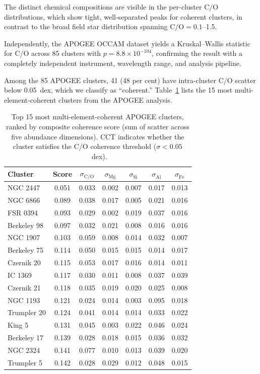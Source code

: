 \documentclass[fleqn,usenatbib]{mnras}
\newcommand{\co}{C/O\xspace}
\begin{document}
The distinct chemical compositions are visible in the per-cluster \co distributions, which show tight, well-separated peaks for coherent clusters, in contrast to the broad field star distribution spanning $\mathrm{C/O} = 0.1$--1.5.

Independently, the APOGEE OCCAM dataset yields a Kruskal--Wallis statistic for \co across 85 clusters with $p = 8.8 \times 10^{-104}$, confirming the result with a completely independent instrument, wavelength range, and analysis pipeline.

Among the 85 APOGEE clusters, 41 (48 per cent) have intra-cluster \co scatter below 0.05~dex, which we classify as ``coherent.''
Table~\ref{tab:coherent_clusters} lists the 15 most multi-element-coherent clusters from the APOGEE analysis.

\begin{table}
\centering
\caption{Top 15 most multi-element-coherent APOGEE clusters, ranked by composite coherence score (sum of scatter across five abundance dimensions). CCT indicates whether the cluster satisfies the C/O coherence threshold ($\sigma < 0.05$~dex).}
\label{tab:coherent_clusters}
\begin{tabular}{lcccccc}
\toprule
Cluster & Score & $\sigma_{\mathrm{C/O}}$ & $\sigma_{\mathrm{Mg}}$ & $\sigma_{\mathrm{Si}}$ & $\sigma_{\mathrm{Al}}$ & $\sigma_{\mathrm{Fe}}$ \\
\midrule
NGC 2447    & 0.051 & 0.033 & 0.002 & 0.007 & 0.017 & 0.013 \\
NGC 6866    & 0.089 & 0.038 & 0.017 & 0.005 & 0.021 & 0.016 \\
FSR 0394    & 0.093 & 0.029 & 0.002 & 0.019 & 0.037 & 0.016 \\
Berkeley 98 & 0.097 & 0.032 & 0.021 & 0.008 & 0.016 & 0.016 \\
NGC 1907    & 0.103 & 0.059 & 0.008 & 0.014 & 0.032 & 0.007 \\
Berkeley 75 & 0.114 & 0.050 & 0.015 & 0.015 & 0.014 & 0.017 \\
Czernik 20  & 0.115 & 0.053 & 0.017 & 0.016 & 0.014 & 0.011 \\
IC 1369     & 0.117 & 0.030 & 0.011 & 0.008 & 0.037 & 0.039 \\
Czernik 21  & 0.118 & 0.035 & 0.019 & 0.020 & 0.025 & 0.008 \\
NGC 1193    & 0.121 & 0.024 & 0.014 & 0.003 & 0.095 & 0.018 \\
Trumpler 20 & 0.124 & 0.041 & 0.014 & 0.014 & 0.033 & 0.022 \\
King 5      & 0.131 & 0.045 & 0.003 & 0.022 & 0.046 & 0.024 \\
Berkeley 17 & 0.139 & 0.028 & 0.018 & 0.015 & 0.036 & 0.032 \\
NGC 2324    & 0.141 & 0.077 & 0.010 & 0.013 & 0.039 & 0.020 \\
Trumpler 5  & 0.142 & 0.028 & 0.029 & 0.012 & 0.048 & 0.015 \\
\bottomrule
\end{tabular}
\end{table}
\end{document}

